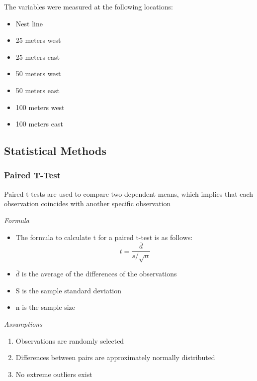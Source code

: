 \documentclass[
]{article}
\providecommand{\tightlist}{%
  \setlength{\itemsep}{0pt}\setlength{\parskip}{0pt}}
\begin{document}
The variables were measured at the following locations:

\begin{itemize}
\tightlist
\item
  Nest line
\item
  25 meters west
\item
  25 meters east
\item
  50 meters west
\item
  50 meters east
\item
  100 meters west
\item
  100 meters east
\end{itemize}

\hypertarget{statistical-methods}{%
\subsection{Statistical Methods}\label{statistical-methods}}

\hypertarget{paired-t-test}{%
\subsubsection{Paired T-Test}\label{paired-t-test}}

Paired t-tests are used to compare two dependent means, which implies that each observation coincides with another specific observation

\emph{Formula}

\begin{itemize}
\tightlist
\item
  The formula to calculate t for a paired t-test is as follows:
  \[t=\frac{\overline{d}}{s/\sqrt{n}}\]
\item
  \(\overline{d}\) is the average of the differences of the observations
\item
  S is the sample standard deviation
\item
  n is the sample size
\end{itemize}

\emph{Assumptions}

\begin{enumerate}
\def\labelenumi{\arabic{enumi}.}
\tightlist
\item
  Observations are randomly selected
\item
  Differences between pairs are approximately normally distributed
\item
  No extreme outliers exist
\end{enumerate}
\end{document}
